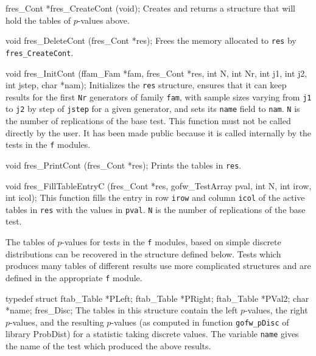 fres_Cont *fres_CreateCont (void);
\endcode
 \tab
  Creates and returns a structure that will hold the tables of $p$-values
  above.
 \endtab
\code


void fres_DeleteCont (fres_Cont *res);
\endcode
 \tab
  Frees the memory allocated to {\tt res} by {\tt fres\_CreateCont}.
 \endtab
\code
\hide

void fres_InitCont (ffam_Fam *fam, fres_Cont *res, int N,
                    int Nr, int j1, int j2, int jstep, char *nam);
\endcode
 \tab
   Initializes the {\tt res} structure, ensures that it can keep results
   for the first {\tt Nr} generators of family {\tt fam}, with sample sizes
   varying from {\tt j1} to {\tt j2} by step of {\tt jstep} for a given
   generator, and sets its {\tt name} field to {\tt nam}.  {\tt N}
   is the number of replications of the base test. This function
   must not be called directly by the user. It has been made public because
   it is called internally by the tests in the {\tt f} modules.
 \endtab
\code
\endhide

void fres_PrintCont (fres_Cont *res);
\endcode
 \tab Prints the tables in {\tt res}.
 \endtab
\code


void fres_FillTableEntryC (fres_Cont *res, gofw_TestArray pval, int N,
                           int irow, int icol);
\endcode
 \tab This function fills the entry in row {\tt irow} and column {\tt icol}
  of the active tables in {\tt res} with the values in {\tt pval}. {\tt N}
  is the number of replications of the base test.
 \endtab





The tables of $p$-values for tests in the {\tt f} modules, based on simple
discrete distributions can be recovered in the structure defined below.
Tests which produces many tables of different results use more complicated
structures and are defined in the appropriate {\tt f} module.

\code

typedef struct {
   ftab_Table *PLeft;
   ftab_Table *PRight;
   ftab_Table *PVal2;
   char *name;
} fres_Disc;
\endcode
 \tab
  The tables in this structure contain the left $p$-values,
  the right $p$-values, and the resulting
  $p$-values (as computed in function {\tt gofw\_pDisc} of library
   ProbDist) for a statistic taking discrete values. The variable
  {\tt name} gives the name of the test which produced the above results.
 \endtab
\code



